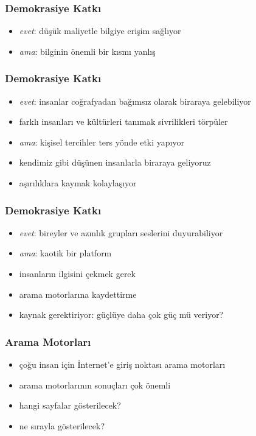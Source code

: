 \documentclass[dvipsnames]{beamer}
\theoremstyle{plain}
\begin{document}
\begin{frame}
  \frametitle{Demokrasiye Katkı}

  \begin{itemize}
    \item \emph{evet}: düşük maliyetle bilgiye erişim sağlıyor

    \medskip
    \item \emph{ama}: bilginin önemli bir kısmı yanlış
  \end{itemize}
\end{frame}

\begin{frame}
  \frametitle{Demokrasiye Katkı}

  \begin{itemize}
    \item \emph{evet}: insanlar coğrafyadan bağımsız olarak biraraya
      gelebiliyor
    \item farklı insanları ve kültürleri tanımak sivrilikleri törpüler

    \medskip
    \item \emph{ama}: kişisel tercihler ters yönde etki yapıyor
    \item kendimiz gibi düşünen insanlarla biraraya geliyoruz
    \item aşırılıklara kaymak kolaylaşıyor
  \end{itemize}
\end{frame}

\begin{frame}
  \frametitle{Demokrasiye Katkı}

  \begin{itemize}
    \item \emph{evet}: bireyler ve azınlık grupları seslerini duyurabiliyor

    \medskip
    \item \emph{ama}: kaotik bir platform
    \item insanların ilgisini çekmek gerek
    \item arama motorlarına kaydettirme
    \item kaynak gerektiriyor: güçlüye daha çok güç mü veriyor?
  \end{itemize}
\end{frame}

\begin{frame}
  \frametitle{Arama Motorları}

  \begin{itemize}
    \item çoğu insan için İnternet'e giriş noktası arama motorları

    \medskip
    \item arama motorlarının sonuçları çok önemli
    \item hangi sayfalar gösterilecek?
    \item ne sırayla gösterilecek?
  \end{itemize}
\end{frame}
\end{document}
